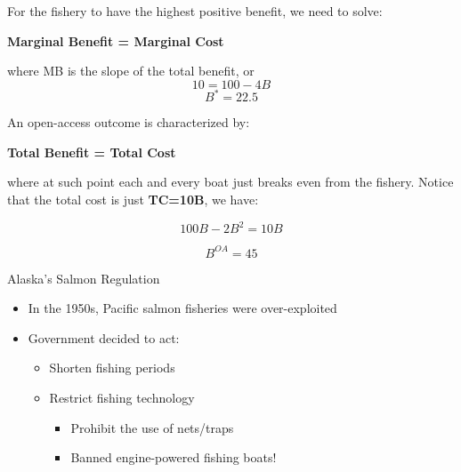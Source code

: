 \begin{frame}{}
\protect\hypertarget{section-13}{}

For the fishery to have the highest positive benefit, we need to solve:

\textbf{Marginal Benefit = Marginal Cost}

where MB is the slope of the total benefit, or \[10 = 100 - 4B\]
\[B^*=22.5\]

\end{frame}

\begin{frame}{An open-access outcome is characterized by:}
\protect\hypertarget{an-open-access-outcome-is-characterized-by}{}

\textbf{Total Benefit = Total Cost}

where at such point each and every boat just breaks even from the
fishery. Notice that the total cost is just \textbf{TC=10B}, we have:

\[100B - 2B^2 = 10B\]

\[B^{OA}=45\]

\end{frame}

\begin{frame}{Alaska's Salmon Regulation}
\protect\hypertarget{alaskas-salmon-regulation}{}

\begin{itemize}
\tightlist
\item
  In the 1950s, Pacific salmon fisheries were over-exploited
\item
  Government decided to act:

  \begin{itemize}
  \tightlist
  \item
    Shorten fishing periods
  \item
    Restrict fishing technology

    \begin{itemize}
    \tightlist
    \item
      Prohibit the use of nets/traps
    \item
      Banned engine-powered fishing boats!
    \end{itemize}
  \end{itemize}
\end{itemize}

\end{frame}

